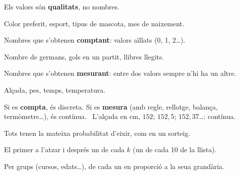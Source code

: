\documentclass[11pt,a4paper]{article}
\begin{document}
\vfill
\begin{tcbraster}[raster columns=3,raster equal height,raster column skip=8pt]
\begin{tcolorbox}[fmbase,colback=fmA!8,colframe=fmA,coltitle=white,title={Qualitativa}]
Els valors són \textbf{qualitats}, no nombres.\par\smallskip
\small Color preferit, esport, tipus de mascota, mes de naixement.
\end{tcolorbox}
\begin{tcolorbox}[fmbase,colback=fmB!8,colframe=fmB,coltitle=white,title={Quantitativa discreta}]
Nombres que s'obtenen \textbf{comptant}: valors aïllats (0, 1, 2\dots).\par\smallskip
\small Nombre de germans, gols en un partit, llibres llegits.
\end{tcolorbox}
\begin{tcolorbox}[fmbase,colback=fmK!8,colframe=fmK,coltitle=white,title={Quantitativa contínua}]
Nombres que s'obtenen \textbf{mesurant}: entre dos valors sempre n'hi ha un altre.\par\smallskip
\small Alçada, pes, temps, temperatura.
\end{tcolorbox}
\end{tcbraster}

\vfill
\begin{truc}
Si es \textbf{compta}, és discreta. Si es \textbf{mesura} (amb regle, rellotge, balança, termòmetre\dots), és contínua. \ L'alçada en cm, $152$; $152{,}5$; $152{,}37$\dots: contínua.
\end{truc}

\vfill
\begin{tcbraster}[raster columns=3,raster equal height,raster column skip=8pt]
\begin{tcolorbox}[fmbase,colback=fmdefbg,colframe=fmdef,coltitle=white,title={\faRandom\ \ Aleatori simple}]
\small Tots tenen la mateixa probabilitat d'eixir, com en un sorteig.
\end{tcolorbox}
\begin{tcolorbox}[fmbase,colback=fmdefbg,colframe=fmdef,coltitle=white,title={\faListOl\ \ Sistemàtic}]
\small El primer a l'atzar i després un de cada $k$ (un de cada 10 de la llista).
\end{tcolorbox}
\begin{tcolorbox}[fmbase,colback=fmdefbg,colframe=fmdef,coltitle=white,title={\faLayerGroup\ \ Estratificat}]
\small Per grups (cursos, edats\dots), de cada un en proporció a la seua grandària.
\end{tcolorbox}
\end{tcbraster}
\end{document}
